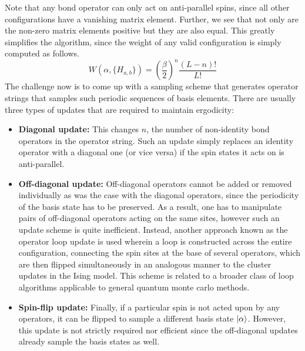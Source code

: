 Note that any bond operator can only act on anti-parallel spins, since all other configurations have a vanishing matrix element. Further, we see that not only are the non-zero matrix elements positive but they are also equal. This greatly simplifies the algorithm, since the weight of any valid configuration is simply computed as follows.
\begin{equation}
    W(\alpha, \{H_{a, b}\}) = \left ( \frac{\beta}{2} \right )^n \frac{(L - n)!}{L!}
\end{equation}
The challenge now is to come up with a sampling scheme that generates operator strings that samples such periodic sequences of basis elements. There are usually three types of updates that are required to maintain ergodicity:
\begin{itemize}
    \item \textbf{Diagonal update:} This changes $n$, the number of non-identity bond operators in the operator string. Such an update simply replaces an identity operator with a diagonal one  (or vice versa) if the spin states it acts on is anti-parallel. 
    \item \textbf{Off-diagonal update: } Off-diagonal operators cannot be added or removed individually as was the case with the diagonal operators, since the periodicity of the basis state has to be preserved. As a result, one has to manipulate pairs of off-diagonal operators acting on the same sites, however such an update scheme is quite inefficient. Instead, another approach known as the operator loop update\cite{Sandvik_1999} is used wherein a loop is constructed across the entire configuration, connecting the spin sites at the base of several operators, which are then flipped simultaneously in an analogous manner to the cluster updates in the Ising model. This scheme is related to a broader class of loop algorithms\cite{evertz2003} applicable to general quantum monte carlo methods.
    \item \textbf{Spin-flip update: } Finally, if a particular spin is not acted upon by any operators, it can be flipped to sample a different basis state $\ket{\alpha}$. However, this update is not strictly required nor efficient since the off-diagonal updates already sample the basis states as well.
\end{itemize}


